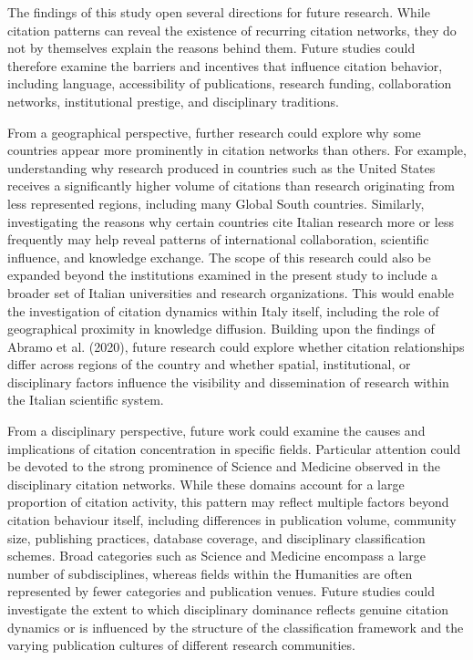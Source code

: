 \documentclass[year=2026]{cup-journal}
\begin{document}
The findings of this study open several directions for future research. While citation patterns can reveal the existence of recurring citation networks, they do not by themselves explain the reasons behind them. Future studies could therefore examine the barriers and incentives that influence citation behavior, including language, accessibility of publications, research funding, collaboration networks, institutional prestige, and disciplinary traditions.

From a geographical perspective, further research could explore why some countries appear more prominently in citation networks than others. For example, understanding why research produced in countries such as the United States receives a significantly higher volume of citations than research originating from less represented regions, including many Global South countries. Similarly, investigating the reasons why certain countries cite Italian research more or less frequently may help reveal patterns of international collaboration, scientific influence, and knowledge exchange. The scope of this research could also be expanded beyond the institutions examined in the present study to include a broader set of Italian universities and research organizations. This would enable the investigation of citation dynamics within Italy itself, including the role of geographical proximity in knowledge diffusion. Building upon the findings of Abramo et al. (2020), future research could explore whether citation relationships differ across regions of the country and whether spatial, institutional, or disciplinary factors influence the visibility and dissemination of research within the Italian scientific system.

From a disciplinary perspective, future work could examine the causes and implications of citation concentration in specific fields. Particular attention could be devoted to the strong prominence of Science and Medicine observed in the disciplinary citation networks. While these domains account for a large proportion of citation activity, this pattern may reflect multiple factors beyond citation behaviour itself, including differences in publication volume, community size, publishing practices, database coverage, and disciplinary classification schemes. Broad categories such as Science and Medicine encompass a large number of subdisciplines, whereas fields within the Humanities are often represented by fewer categories and publication venues. Future studies could investigate the extent to which disciplinary dominance reflects genuine citation dynamics or is influenced by the structure of the classification framework and the varying publication cultures of different research communities.
\end{document}
